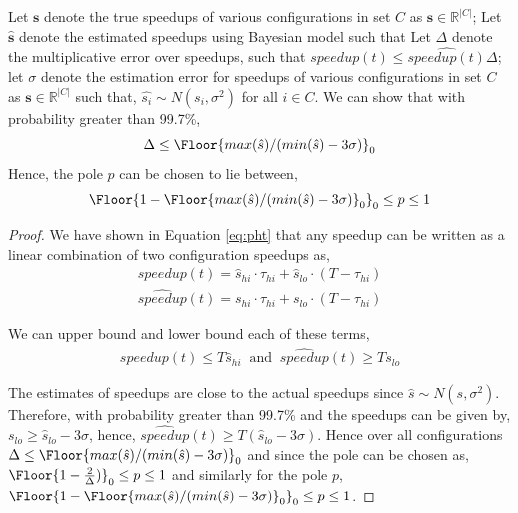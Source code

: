 \begin{theorem}
Let $\mathbf{s}$ denote the true speedups of various configurations in set $C$ as $\mathbf{s} \in \mathbb{R}^{|C|}$; Let $\hat{\mathbf{s}}$ denote the estimated speedups using Bayesian model such that
Let $\Delta$ denote the multiplicative error over speedups, such that $speedup(t) \leq \hat{speedup(t)}\Delta $; let $\sigma$ denote the estimation error for speedups of various configurations in set $C$ as $\mathbf{s} \in \mathbb{R}^{|C|}$ such that, $\hat{s_i} \sim N(s_i, \sigma^2)$ for all $i \in C$. We can show that with probability greater than 99.7\%,
$$
\Delta \leq \Floor{max(\hat{s})/(min(\hat{s}) -  3\sigma)}_0
$$
Hence, the pole $p$ can be chosen to lie between, $$\Floor{1- \Floor{max(\hat{s})/(min(\hat{s}) -  3\sigma)}_0}_0 \leq p \leq 1$$
\end{theorem}

\begin{proof}
We have shown in Equation \ref{eq:pht} that any speedup can be written as a
linear combination of two configuration speedups as,
\begin{align}
speedup(t) = \hat{s}_{hi} \cdot \tau_{hi} + \hat{s}_{lo} \cdot (T - \tau_{hi})
\end{align}
\begin{align}
\widehat{speedup}(t) = s_{hi} \cdot \tau_{hi} + s_{lo} \cdot (T - \tau_{hi})
\end{align}

We can upper bound and lower bound each of these terms,
\begin{align}
speedup(t) \leq T \hat{s}_{hi} \;\; \text{and} \;\; \widehat{speedup}(t) \geq T s_{lo}
\end{align}

The estimates of speedups are close to the actual speedups since
$\hat{s} \sim N(s, \sigma^2)$. Therefore,  with probability greater than 99.7\%
and the speedups can be given by, $s_{lo} \geq \hat{s}_{lo} - 3 \sigma$,
hence, $\hat{speedup}(t) \geq T (\hat{s}_{lo} -3 \sigma)$. Hence over all
configurations $\Delta \leq \Floor{max(\hat{s})/(min(\hat{s}) -  3\sigma)}_0$
and since the pole can be chosen as, $\Floor{1-\frac{2}{\Delta})}_0\leq p \leq 1$
and similarly for the pole $p$,
$\Floor{1- \Floor{max(\hat{s})/(min(\hat{s}) -  3\sigma)}_0}_0 \leq p \leq 1$.

\end{proof}
